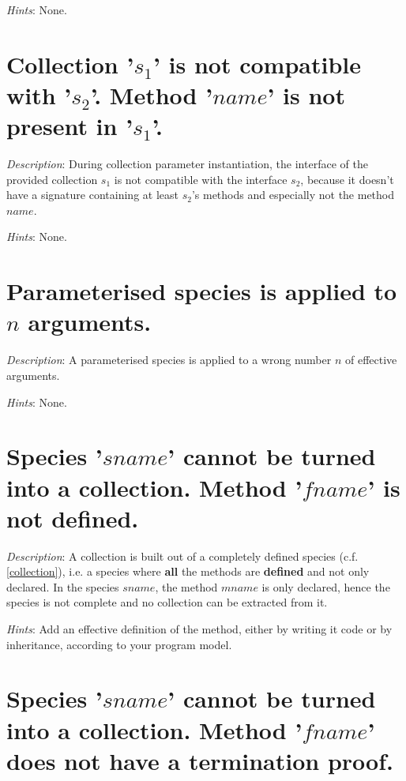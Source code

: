 {\em Hints}: None.



\section*{Collection  '$s_1$' is not compatible with  '$s_2$'.  Method '$name$'
  is not present in '$s_1$'.}

{\em Description}:  During collection parameter instantiation, the
interface of the 
provided collection  $s_1$ is not compatible with the interface $s_2$,
because it doesn't have a signature containing at
least $s_2$'s methods and especially not the method $name$.

{\em Hints}: None.



\section*{Parameterised species is applied to $n$ arguments.}

{\em Description}: A parameterised species is applied to a wrong
number $n$ of effective arguments.

{\em Hints}: None.



\section*{Species '$sname$' cannot be turned into a collection. Method
  '$fname$' is not defined.}

{\em Description}: A collection is built  out of a  completely defined species
(c.f. \ref{collection}), i.e. a species where {\bf all} the methods
are {\bf defined} and not only declared. In the species $sname$, the
method $mname$ is only declared, hence the species is not complete and
no collection can be extracted from it.

{\em Hints}: Add an effective definition of the method, either by
writing it code or by inheritance, according to your program model.



\section*{Species '$sname$' cannot be turned into a collection.
  Method '$fname$' does not have a termination proof.}

